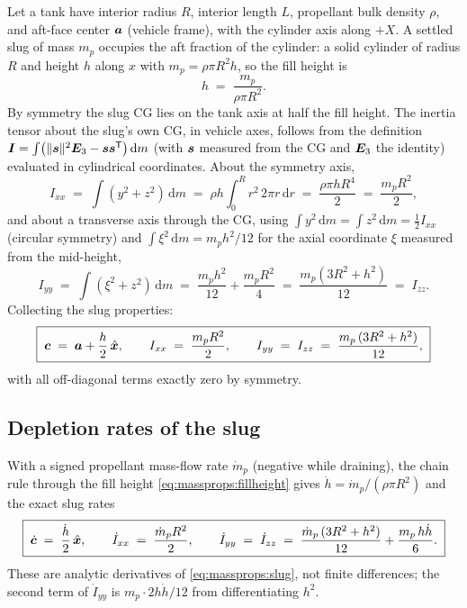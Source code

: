 Let a tank have interior radius $R$, interior length $L$, propellant
bulk density $\rho$, and aft-face center $\bm{a}$ (vehicle frame), with
the cylinder axis along $+X$. A settled slug of mass $m_p$ occupies the
aft fraction of the cylinder: a solid cylinder of radius $R$ and height
$h$ along $x$ with $m_p = \rho \pi R^2 h$, so the fill height is
\begin{equation}
  h \;=\; \frac{m_p}{\rho \pi R^2}.
  \label{eq:massprops:fillheight}
\end{equation}
By symmetry the slug CG lies on the tank axis at half the fill height.
The inertia tensor about the slug's own CG, in vehicle axes, follows
from the definition
$\bm{I} = \int \bigl(\lVert\bm{s}\rVert^2 \bm{E}_3 -
\bm{s}\bm{s}^{\mathsf{T}}\bigr)\,\mathrm{d}m$
(with $\bm{s}$ measured from the CG and $\bm{E}_3$ the identity)
evaluated in cylindrical coordinates. About the symmetry axis,
\begin{equation*}
  I_{xx} \;=\; \int (y^2 + z^2)\,\mathrm{d}m
  \;=\; \rho h \int_0^R r^2\, 2\pi r\,\mathrm{d}r
  \;=\; \frac{\rho \pi h R^4}{2}
  \;=\; \frac{m_p R^2}{2},
\end{equation*}
and about a transverse axis through the CG, using
$\int y^2\,\mathrm{d}m = \int z^2\,\mathrm{d}m = \tfrac{1}{2} I_{xx}$
(circular symmetry) and
$\int \xi^2\,\mathrm{d}m = m_p h^2 / 12$ for the axial coordinate $\xi$
measured from the mid-height,
\begin{equation*}
  I_{yy} \;=\; \int (\xi^2 + z^2)\,\mathrm{d}m
  \;=\; \frac{m_p h^2}{12} + \frac{m_p R^2}{4}
  \;=\; \frac{m_p (3R^2 + h^2)}{12} \;=\; I_{zz}.
\end{equation*}
Collecting the slug properties:
\begin{equation}
  \boxed{\;
  \bm{c} \;=\; \bm{a} + \frac{h}{2}\,\hat{\bm{x}}, \qquad
  I_{xx} \;=\; \frac{m_p R^2}{2}, \qquad
  I_{yy} \;=\; I_{zz} \;=\; \frac{m_p\,(3R^2 + h^2)}{12},\;}
  \label{eq:massprops:slug}
\end{equation}
with all off-diagonal terms exactly zero by symmetry.

\subsection{Depletion rates of the slug}

With a signed propellant mass-flow rate $\dot{m}_p$ (negative while
draining), the chain rule through the fill height
\eqref{eq:massprops:fillheight} gives $\dot{h} = \dot{m}_p /
(\rho \pi R^2)$ and the exact slug rates
\begin{equation}
  \boxed{\;
  \dot{\bm{c}} \;=\; \frac{\dot{h}}{2}\,\hat{\bm{x}}, \qquad
  \dot{I}_{xx} \;=\; \frac{\dot{m}_p R^2}{2}, \qquad
  \dot{I}_{yy} \;=\; \dot{I}_{zz} \;=\;
    \frac{\dot{m}_p\,(3R^2 + h^2)}{12} + \frac{m_p\, h \dot{h}}{6}.\;}
  \label{eq:massprops:slugrates}
\end{equation}
These are analytic derivatives of \eqref{eq:massprops:slug}, not finite
differences; the second term of $\dot{I}_{yy}$ is
$m_p \cdot 2 h \dot{h} / 12$ from differentiating $h^2$.

